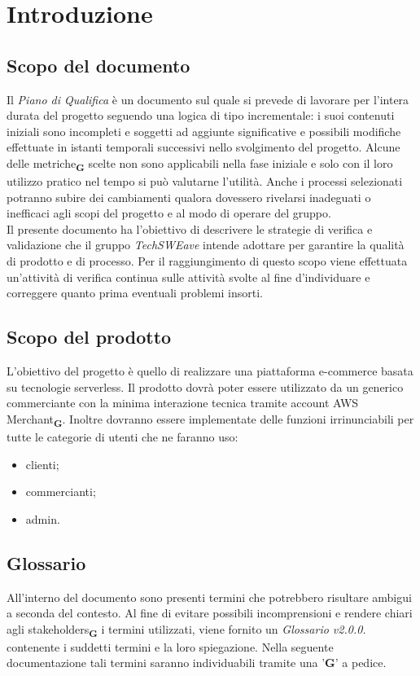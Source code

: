 \section{Introduzione}
\subsection{Scopo del documento}
Il \textit{Piano di Qualifica} è un documento sul quale si prevede di lavorare per l'intera durata del progetto seguendo una
logica di tipo incrementale: i suoi contenuti iniziali sono incompleti e soggetti ad aggiunte significative e possibili modifiche
effettuate in istanti temporali successivi nello svolgimento del progetto.
Alcune delle metriche\textsubscript{\textbf{G}} scelte non sono applicabili nella fase iniziale e solo con il loro utilizzo pratico nel tempo
si può valutarne l'utilità. Anche i processi selezionati potranno subire dei cambiamenti qualora dovessero rivelarsi
inadeguati o inefficaci agli scopi del progetto e al modo di operare del gruppo.\\
Il presente documento ha l'obiettivo di descrivere le strategie di verifica e validazione che il gruppo \textit{TechSWEave} intende
adottare per garantire la qualità di prodotto e di processo. Per il raggiungimento di questo scopo viene effettuata
un'attività di verifica continua sulle attività svolte al fine d'individuare e correggere quanto prima
eventuali problemi insorti.
\subsection{Scopo del prodotto}
L'obiettivo del progetto è quello di realizzare una piattaforma e-commerce basata su tecnologie serverless. Il prodotto dovrà poter essere utilizzato da un generico commerciante con la minima interazione tecnica tramite account AWS Merchant\textsubscript{\textbf{G}}. Inoltre dovranno essere implementate delle funzioni irrinunciabili per tutte le categorie di utenti che ne faranno uso:
\begin{itemize}
    \item clienti;
    \item commercianti;
    \item admin.
\end{itemize}
\subsection{Glossario}
All'interno del documento sono presenti termini che potrebbero risultare ambigui a seconda del contesto. Al fine di evitare possibili incomprensioni
e rendere chiari agli stakeholders\textsubscript{\textbf{G}} i termini utilizzati, viene fornito un \textit{Glossario v2.0.0.} contenente i suddetti termini
e la loro spiegazione. Nella seguente documentazione tali termini saranno individuabili tramite una '\textbf{G}' a pedice.
